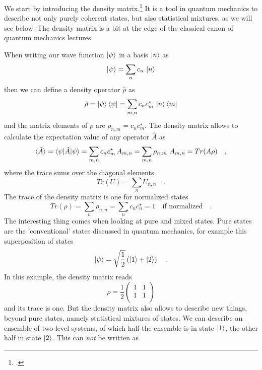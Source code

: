We start by introducing the density matrix.\footcite{Rand2016,Parson,Hamm-dummies}
It is a tool in quantum mechanics to describe not only purely coherent states, but also statistical mixtures, as we will see below. The density matrix is a bit at the edge of the classical canon of quantum mechanics lectures.

When  writing our wave function $\ket{\psi}$ in  a basis $\ket{n}$ as
\begin{equation}
 \ket{\psi} = \sum_n c_n \, \ket{n}
\end{equation}
then we can define a density operator $\hat{\rho}$ as
\begin{equation}
\hat{\rho} =  \ket{\psi}\bra{\psi} = \sum_{m,n} c_n c_m^\star \, \ket{n}\bra{m}
\end{equation}
and the matrix elements of $\rho$ are $\rho_{n,m} =  c_n c_m^\star$. The density matrix allows to calculate the expectation value of any operator $\hat{A}$ as
\begin{equation}
 \braket{\hat{A}} =  \braket{\psi | \hat{A} | \psi}  = \sum_{m,n} c_n c_m^\star \, A_{m,n} = \sum_{m,n} \rho_{n,m} \,  \, A_{m,n} = Tr ( A \rho) \quad ,
\end{equation}
where the trace sums over the diagonal elements
\begin{equation}
 Tr (U ) = \sum_n U_{n,n}  \quad .
\end{equation}
The trace of the density matrix is one for normalized states 
\begin{equation}
 Tr (\rho) = \sum_n \rho_{n,n} = \sum_n c_n c_n^\star = 1 \quad \text{if normalized} \quad .
\end{equation}
The interesting thing comes when looking at pure and mixed states. Pure states are the 'conventional' states discussed in quantum mechanics, for example this superposition of states
\begin{equation}
\ket{\psi} = \sqrt{\frac{1}{2}} \left( \ket{1} + \ket{2} \right)  \quad .
\end{equation}
In this example, the density matrix reads
\begin{equation}
 \rho = \frac{1}{2} \begin{pmatrix}
 1 & 1 \\ 1 & 1 \\
 \end{pmatrix}
\end{equation}
and its trace is one. But the density matrix also allows to describe new things, beyond pure states, namely statistical mixtures of states. We can describe an ensemble of two-level systems, of which half the ensemble is in state $\ket{1}$, the other half in state $\ket{2}$. This can \emph{not} be written as 
